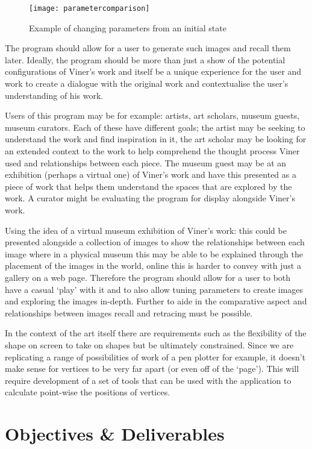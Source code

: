 \begin{figure}[H]
    \texttt{[image: parametercomparison]}
    \caption{Example of changing parameters from an initial state}
\end{figure}

The program should allow for a user to generate such images and recall them
later. Ideally, the program should be more than just a show of the potential
configurations of Viner's work and itself be a unique experience for the user
and work to create a dialogue with the original work and contextualise the
user's understanding of his work.

Users of this program may be for example: artists, art scholars, museum guests,
museum curators. Each of these have different goals; the artist may be seeking
to understand the work and find inspiration in it, the art scholar may be
looking for an extended context to the work to help comprehend the thought
process Viner used and relationships between each piece. The museum guest may be
at an exhibition (perhaps a virtual one) of Viner's work and have this presented
as a piece of work that helps them understand the spaces that are explored by
the work. A curator might be evaluating the program for display alongside
Viner's work.

Using the idea of a virtual museum exhibition of Viner's work: this could be
presented alongside a collection of images to show the relationships between
each image where in a physical museum this may be able to be explained through
the placement of the images in the world, online this is harder to convey with
just a gallery on a web page. Therefore the program should allow for a user to
both have a casual `play' with it and to also allow tuning parameters to create
images and exploring the images in-depth. Further to aide in the comparative
aspect and relationships between images recall and retracing must be possible.

In the context of the art itself there are requirements such as the flexibility
of the shape on screen to take on shapes but be ultimately constrained. Since we
are replicating a range of possibilities of work of a pen plotter for example,
it doesn't make sense for vertices to be very far apart (or even off of the
`page'). This will require development of a set of tools that can be used with
the application to calculate point-wise the positions of vertices.

\section{Objectives \& Deliverables}
